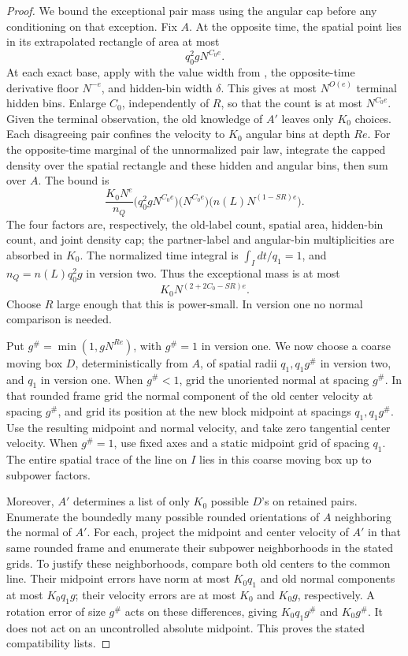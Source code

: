 \begin{proof}
We bound the exceptional pair mass using the angular cap before
any conditioning on that exception.  Fix \(A\).  At the opposite
time, the spatial point lies in its extrapolated rectangle of
area at most
\[
 q_0^2gN^{C_0e}.
\]
At each exact base, apply  with
the value width from , the
opposite-time derivative floor \(N^{-e}\), and hidden-bin
width \(\delta\).  This gives at most \(N^{O(e)}\) terminal
hidden bins.  Enlarge \(C_0\), independently of \(R\), so that
the count is at most \(N^{C_0e}\).  Given the terminal observation, the old
knowledge of \(A'\) leaves only \(K_0\) choices.  Each disagreeing
pair confines the velocity to \(K_0\) angular bins at depth
\(Re\).  For the opposite-time marginal of the unnormalized pair
law, integrate the capped density over the spatial rectangle and
these hidden and angular bins, then sum over \(A\).  The bound is
\[
 \frac{K_0N^e}{n_Q}
 \bigl(q_0^2gN^{C_0e}\bigr)
 \bigl(N^{C_0e}\bigr)
 \bigl(n(L)N^{(1-SR)e}\bigr).
\]
The four factors are, respectively, the old-label count, spatial
area, hidden-bin count, and joint density cap; the partner-label
and angular-bin multiplicities are absorbed in \(K_0\).
The normalized time integral is \(\int_I dt/q_1=1\), and
\(n_Q=n(L)q_0^2g\) in version two.  Thus the exceptional mass is at most
\begin{equation}
 K_0N^{(2+2C_0-SR)e}.
 \label{a02:normal-exception}
\end{equation}
Choose \(R\) large enough that this is power-small.  In version
one no normal comparison is needed.

Put \(g^\#=\min(1,gN^{Re})\), with \(g^\#=1\) in version one.
We now choose a coarse moving box \(D\), deterministically from
\(A\), of spatial radii \(q_1,q_1g^\#\) in version two, and
\(q_1\) in version one.  When \(g^\#<1\), grid the unoriented
normal at spacing \(g^\#\).  In that rounded frame grid the
normal component of the old center velocity at spacing \(g^\#\),
and grid its position at the new block midpoint at spacings
\(q_1,q_1g^\#\).  Use the resulting midpoint and normal velocity,
and take zero tangential center velocity.  When \(g^\#=1\), use
fixed axes and a static midpoint grid of spacing \(q_1\).
The entire spatial trace of the line on \(I\) lies in this
coarse moving box up to subpower factors.

Moreover, \(A'\) determines a list of only \(K_0\) possible
\(D\)'s on retained pairs.  Enumerate the boundedly many possible
rounded orientations of \(A\) neighboring the normal of \(A'\).
For each, project the midpoint and center velocity of \(A'\)
in that same rounded frame and enumerate their subpower
neighborhoods in the stated grids.  To justify these
neighborhoods, compare both old centers to the common line.
Their midpoint errors have norm at most \(K_0q_1\) and old
normal components at most \(K_0q_1g\); their velocity errors
are at most \(K_0\) and \(K_0g\), respectively.  A rotation
error of size \(g^\#\) acts on these differences, giving
\(K_0q_1g^\#\) and \(K_0g^\#\).  It does not act on an
uncontrolled absolute midpoint.  This proves the stated
compatibility lists.


\end{proof}

